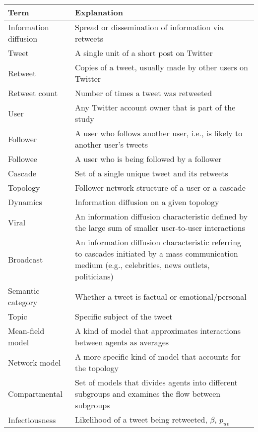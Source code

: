 \documentclass[11pt,a4paper]{article}
\begin{document}
\begin{table}[h]
    \hypertarget{fig:table1}{}
    \label{tab:table1}
    \centering
    \small
    \begin{tabularx}{\textwidth}{|l|X|}
        \hline
        \textbf{Term} & \textbf{Explanation} \\
        \hline
        Information diffusion & Spread or dissemination of information via retweets  \\
        Tweet & A single unit of a short post on Twitter \\
        Retweet & Copies of a tweet, usually made by other users on Twitter \\
        Retweet count & Number of times a tweet was retweeted \\
        User & Any Twitter account owner that is part of the study \\
        Follower & A user who follows another user, i.e., is likely to another user's tweets \\
        Followee & A user who is being followed by a follower \\
        Cascade & Set of a single unique tweet and its retweets \\
        Topology & Follower network structure of a user or a cascade \\
        Dynamics & Information diffusion on a given topology \\
        Viral & An information diffusion characteristic defined by the large sum of smaller user-to-user interactions \\
        Broadcast & An information diffusion characteristic referring to cascades initiated by a mass communication medium (e.g., celebrities, news outlets, politicians) \\
        Semantic category & Whether a tweet is factual or emotional/personal \\
        Topic & Specific subject of the tweet \\
        Mean-field model & A kind of model that approximates interactions between agents as averages \\
        Network model & A more specific kind of model that accounts for the topology \\
        Compartmental & Set of models that divides agents into different subgroups and examines the flow between subgroups \\
        Infectiousness  & Likelihood of a tweet being retweeted, $\beta$, $p_{uv}$ \\

\end{tabularx}
\end{table}
\end{document}
